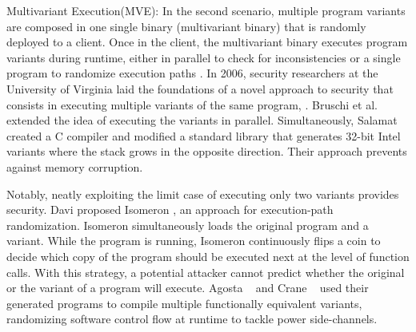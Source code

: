 \begin{usage}{Multivariant Execution(MVE):}
    \label{usage:mve}
    \normalfont
    In the second scenario, multiple program variants are composed in one single binary (multivariant binary) that is randomly deployed to a client. Once in the client, the multivariant binary executes program variants during runtime, either in parallel to check for inconsistencies or a single program to randomize execution paths \cite{bhatkar03}.
    In 2006, security researchers at the University of Virginia laid the foundations of a novel approach to security that consists in executing multiple variants of the same program, \cite{cox06}. Bruschi et al. \cite{bruschi2007diversified} extended the idea of executing the variants in parallel. Simultaneously, Salamat \etal \cite{salamat2007stopping} created a C compiler and modified a standard library that generates 32-bit Intel variants where the stack grows in the opposite direction. Their approach prevents against memory corruption. 
    
    Notably, neatly exploiting the limit case of executing only two variants \cite{salamat2009orchestra, maurer2012tachyon,Kim2015, lu2018stopping} provides security. Davi \etal proposed Isomeron \cite{davi2015isomeron}, an approach  for execution-path randomization. Isomeron simultaneously loads the original program and a variant. While the program is running, Isomeron continuously flips a coin to decide which copy of the program should be executed next at the level of function calls. With this strategy, a potential attacker cannot predict whether the original or the variant of a program will execute.
    Agosta \etal~\cite{agosta2015meet} and Crane \etal~\cite{crane2015thwarting} used their generated programs to compile multiple functionally equivalent variants, randomizing software control flow at runtime to tackle power side-channels.  
    

    
\end{usage}


